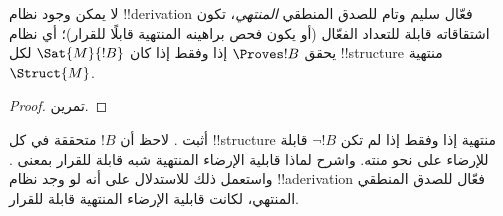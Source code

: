 \documentclass[../../../include/open-logic-section]{subfiles}
\begin{document}
\begin{cor}%
  لا يمكن وجود نظام !!{derivation} فعّال سليم وتام للصدق المنطقي
  \emph{المنتهي}، تكون اشتقاقاته قابلة للتعداد الفعّال (أو يكون فحص
  براهينه المنتهية قابلًا للقرار)؛ أي نظام يحقق $\Proves !B$ إذا وفقط
  إذا كان $\Sat{M}{!B}$ لكل !!{structure} منتهية~$\Struct{M}$.
\end{cor}

\begin{proof}
  تمرين.
\end{proof}

\begin{prob}
  أثبت . لاحظ أن $!B$ متحققة
  في كل !!{structure} منتهية إذا وفقط إذا لم تكن $\lnot !B$ قابلة
  للإرضاء على نحو منته. واشرح لماذا قابلية الإرضاء المنتهية شبه قابلة
  للقرار بمعنى . واستعمل ذلك
  للاستدلال على أنه لو وجد نظام !!a{derivation} فعّال للصدق المنطقي المنتهي،
  لكانت قابلية الإرضاء المنتهية قابلة للقرار.
\end{prob}
\end{document}
